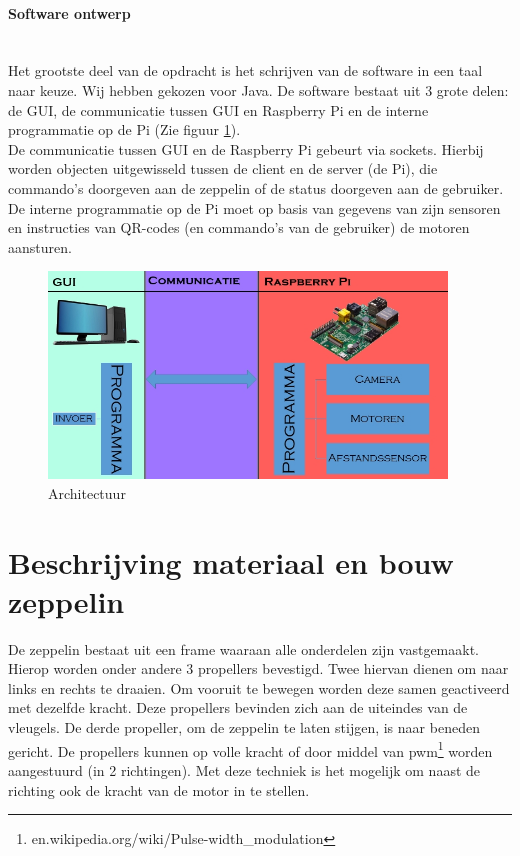 \documentclass[eind]{penoverslag}
\begin{document}
\paragraph{Software ontwerp}
~\\
Het grootste deel van de opdracht is het schrijven van de software in een taal naar keuze. Wij hebben gekozen voor Java. De software bestaat uit 3 grote delen: de GUI, de communicatie tussen GUI en Raspberry Pi en de interne programmatie op de Pi (Zie figuur \ref{schema}). \\
De communicatie tussen GUI en de Raspberry Pi gebeurt via sockets. Hierbij worden objecten uitgewisseld tussen de client en de server (de Pi), die commando's doorgeven aan de zeppelin of de status doorgeven aan de gebruiker. De interne programmatie op de Pi moet op basis van gegevens van zijn sensoren en instructies van QR-codes (en commando's van de gebruiker) de motoren aansturen. 

\begin{figure}[ht!]
\centering
\includegraphics[height=55mm]{Schema.jpg}
\caption{Architectuur}
\label{schema}
\end{figure}

\newpage

\section{Beschrijving materiaal en bouw zeppelin}
De zeppelin bestaat uit een frame waaraan alle onderdelen zijn vastgemaakt. Hierop worden onder andere 3 propellers bevestigd. Twee hiervan dienen om naar links en rechts te draaien. Om vooruit te bewegen worden deze samen geactiveerd met dezelfde kracht. Deze propellers bevinden zich aan de uiteindes van de vleugels. De derde propeller, om de zeppelin te laten stijgen, is naar beneden gericht. De propellers kunnen op volle kracht of door middel van pwm\footnote{en.wikipedia.org/wiki/Pulse-width\_modulation}  worden aangestuurd (in 2 richtingen). Met deze techniek is het mogelijk om naast de richting ook de kracht van de motor in te stellen.~\\
\end{document}

